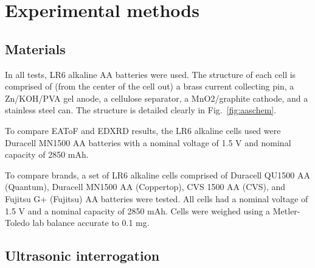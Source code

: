 \section{Experimental methods}
\label{sec:alkbw:exp}

\subsection{Materials}

In all tests, LR6 alkaline AA batteries were used. The structure of each cell is comprised of (from the center of the cell out) a brass current collecting pin, a Zn/KOH/PVA gel anode, a cellulose separator, a MnO2/graphite cathode, and a stainless steel can. The structure is detailed clearly in Fig.~\ref{fig:aaschem}.

To compare EAToF and EDXRD results, the LR6 alkaline cells used were Duracell MN1500 AA batteries with a nominal voltage of 1.5 V and nominal capacity of 2850 mAh.

To compare brands, a set of LR6 alkaline cells comprised of Duracell QU1500 AA (Quantum), Duracell MN1500 AA (Coppertop), CVS 1500 AA (CVS), and Fujitsu G+ (Fujitsu) AA batteries were tested. All cells had a nominal voltage of 1.5 V and a nominal capacity of 2850 mAh. Cells were weighed using a Metler-Toledo lab balance accurate to 0.1 mg.

\subsection{Ultrasonic interrogation}

